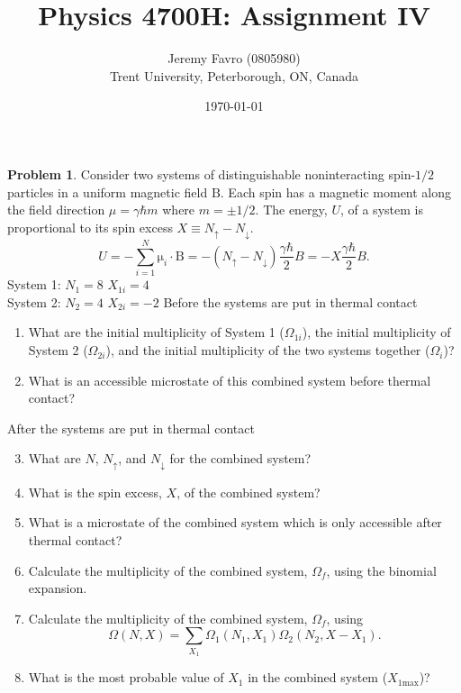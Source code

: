 \documentclass[10pt]{article}
\title{Physics 4700H: Assignment IV}
\author{Jeremy Favro (0805980) \\ Trent University, Peterborough, ON, Canada}
\date{\today}
\theoremstyle{definition}
\newtheorem{problem}{Problem}
\newcommand{\bv}[1]{\bm{\mathrm{#1}}}
\begin{document}
\maketitle

\begin{problem}
Consider two systems of distinguishable noninteracting spin-$1/2$ particles in a uniform
magnetic field $\bv{B}$. Each spin has a magnetic moment along the field direction $\mu=\gamma\hbar m$ where
$m = \pm1/2$. The energy, $U$, of a system is proportional to its spin excess $X\equiv N_\uparrow-N_\downarrow$.
$$U=-\sum_{i=1}^{N}\bv{\mu}_i\cdot\bv{B}=-(N_\uparrow-N_\downarrow)\frac{\gamma\hbar}{2}B=-X\frac{\gamma\hbar}{2}B.$$
System 1: $N_1=8$ $X_{1i}=4$\\
System 2: $N_2=4$ $X_{2i}=-2$
Before the systems are put in thermal contact
\begin{enumerate}[label=(\alph*)]
  \item What are the initial multiplicity of System 1 ($\Omega_{1i}$), the initial multiplicity of System 2
        ($\Omega_{2i}$), and the initial multiplicity of the two systems together ($\Omega_{i}$)?
  \item What is an accessible microstate of this combined system before thermal contact?
\end{enumerate}
After the systems are put in thermal contact
\begin{enumerate}[label=(\alph*)]
  \setcounter{enumi}{2}
  \item What are $N$, $N_\uparrow$, and $N_\downarrow$ for the combined system?
  \item What is the spin excess, $X$, of the combined system?
  \item What is a microstate of the combined system which is only accessible after thermal
        contact?
  \item Calculate the multiplicity of the combined system, $\Omega_f$, using the binomial expansion.
  \item Calculate the multiplicity of the combined system, $\Omega_f$, using
        $$\Omega(N,X)=\sum_{X_1}\Omega_1(N_1,X_1)\Omega_2(N_2, X-X_1).$$
  \item What is the most probable value of $X_1$ in the combined system ($X_{1\text{max}}$)?
\end{enumerate}
\end{problem}
\end{document}

